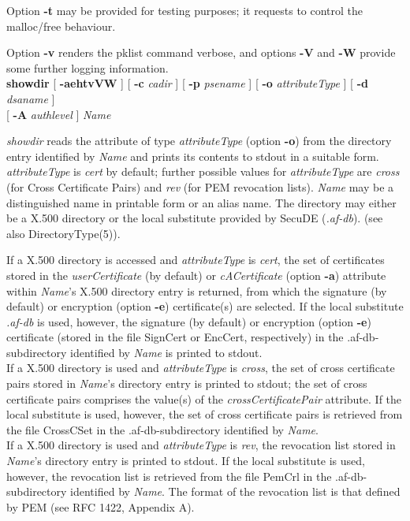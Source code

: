 Option {\bf -t} may be provided for testing purposes; it requests to control the malloc/free behaviour.

Option {\bf -v} renders the pklist command verbose, and options {\bf -V} and {\bf -W} 
provide some further logging information.
\\ [1em]
{\bf showdir} [ {\bf -aehtvVW} ] [ {\bf -c} {\em cadir} ] [ {\bf -p} {\em psename} ] [ {\bf -o} {\em attributeType} ] [ {\bf -d} {\em dsaname} ] \\
\hspace*{2cm} [ {\bf -A} {\em authlevel} ] {\em Name}

{\em showdir} reads the attribute of type {\em attributeType} (option {\bf -o}) from the directory entry
identified by {\em Name} and prints its contents to stdout in a suitable form.
{\em attributeType} is {\em cert} by default; further possible values for {\em attributeType} are
{\em cross} (for Cross Certificate Pairs) and {\em rev} (for PEM revocation lists).
{\em Name} may be a distinguished name in printable form or an alias name.
The directory may either be a X.500 directory or the local substitute provided by 
SecuDE ({\em .af-db}). (see also DirectoryType(5)).
 
If a X.500 directory is accessed and {\em attributeType} is {\em cert},
the set of certificates stored in the {\em userCertificate} (by default) or 
{\em cACertificate} (option {\bf -a}) attribute within {\em Name}'s X.500 directory entry
is returned, from which the signature (by default) or encryption (option {\bf -e}) certificate(s) 
are selected.
If the local substitute {\em .af-db} is used, however, the signature (by default) or encryption 
(option {\bf -e}) certificate (stored in the file SignCert or EncCert, respectively) in the 
.af-db-subdirectory identified by {\em Name} is printed to stdout. \\
If a X.500 directory is used and {\em attributeType} is {\em cross}, the set of cross certificate 
pairs stored in {\em Name}'s directory entry is printed to stdout; the set of 
cross certificate pairs comprises the value(s) of the {\em crossCertificatePair} attribute. 
If the local substitute is used, however, the set of cross certificate pairs is retrieved from the file CrossCSet in the .af-db-subdirectory identified by {\em Name}. \\
If a X.500 directory is used and {\em attributeType} is {\em rev}, the revocation list stored 
in {\em Name}'s directory entry is printed to stdout. 
If the local substitute is used, however, the revocation list is 
retrieved from the file PemCrl in the .af-db-subdirectory identified by {\em Name}.
The format of the revocation list is that defined by PEM (see RFC 1422, Appendix A).
 
